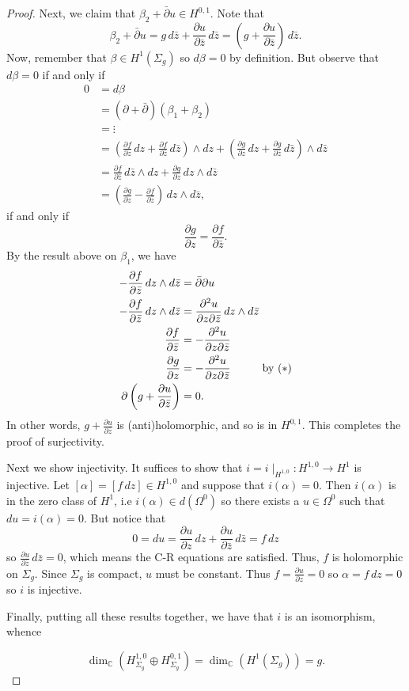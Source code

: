 \documentclass[11pt,oneside,english,reqno]{amsart}
\theoremstyle{definition}
\newcommand{\pspace}{\hspace{10mm}}
\newcommand{\pp}[2]{\frac{\partial{#1}}{\partial{#2}}}
\newcommand{\MB}[1]{\mathbb{#1}}
\begin{document}
\begin{enumerate}[leftmargin=*]
\begin{proof}
Next, we claim that $\beta_2+\bar\partial u\in H^{0,1}$. Note that
\[
\beta_2+\bar\partial u=g\,d\bar z+\pp{u}{\bar z}\,d\bar z=\left(g+\pp{u}{\bar z}\right)\,d\bar z.
\]
Now, remember that $\beta\in H^1(\Sigma_g)$ so $d\beta=0$ by definition. But observe that $d\beta=0$ if and only if
\begin{align*}
0&=d\beta\\
&=(\partial+\bar\partial)(\beta_1+\beta_2)\\
&=\vdots\\
&=\left(\pp{f}{z}\,dz+\pp{f}{\bar z}\,d\bar z\right)\wedge dz+\left(\pp{g}{z}\,dz+\pp{g}{\bar z}\,d\bar z\right)\wedge d\bar z\\
&=\pp{f}{\bar z}\,d\bar z\wedge dz+\pp{g}{z}\,dz\wedge d\bar z\\
&=\left(\pp{g}{z}-\pp{f}{\bar z}\right)\,dz\wedge d\bar z,
\end{align*}
if and only if
\[
\pp{g}{z}=\pp{f}{\bar z}.\tag{$*$}
\]
By the result above on $\beta_1$, we have
\begin{align*}
-\pp{f}{\bar z}\,dz\wedge d\bar z&=\bar\partial\partial u\\
-\pp{f}{\bar z}\,dz\wedge d\bar z&=\pp{^2u}{z\partial\bar z}\,dz\wedge d\bar z\\
\pp{f}{\bar z}&=-\pp{^2u}{z\partial\bar z}\\
\pp{g}{z}&=-\pp{^2u}{z\partial\bar z}\pspace\text{by $(*)$}\\
\partial\left(g+\pp{u}{\bar z}\right)&=0.
\end{align*}
In other words, $g+\pp{u}{\bar z}$ is (anti)holomorphic, and so is in $H^{0,1}$. This completes the proof of surjectivity.

Next we show injectivity. It suffices to show that $i=i\mid_{H^{1,0}}:H^{1,0}\to H^1$ is injective. Let $[\alpha]=[f\,dz]\in H^{1,0}$ and suppose that $i(\alpha)=0$. Then $i(\alpha)$ is in the zero class of $H^1$, i.e $i(\alpha)\in d(\Omega^0)$ so there exists a $u\in \Omega^0$ such that $du=i(\alpha)=0$. But notice that
\[
0=du=\pp{u}{z}\,dz+\pp{u}{\bar z}\,d\bar z=f\,dz
\]
so $\pp{u}{\bar z}\,d\bar z=0$, which means the C-R equations are satisfied. Thus, $f$ is holomorphic on $\Sigma_g$. Since $\Sigma_g$ is compact, $u$ must be constant. Thus $f=\pp{u}{z}=0$ so $\alpha=f\,dz=0$ so $i$ is injective.

Finally, putting all these results together, we have that $i$ is an isomorphism, whence

\[
\dim_\MB{C}\left(H^{1,0}_{\Sigma_g}\oplus H^{0,1}_{\Sigma_g}\right)=\dim_\MB{C} (H^1(\Sigma_g))=g.
\]
\end{proof}



\end{enumerate}
\end{document}
